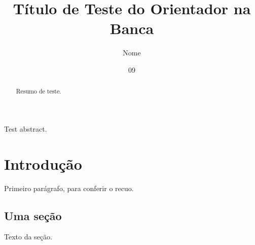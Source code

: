 \documentclass[dsc,orientadorexamina]{ufrj}
\title{Título de Teste do Orientador na Banca}
\author{Nome}{de Teste}
\date{09}{2026}
\begin{document}
  \maketitle
  \frontmatter
  \begin{abstract}
    Resumo de teste.
  \end{abstract}
  \begin{foreignabstract}
    Test abstract.
  \end{foreignabstract}
  \tableofcontents
  \mainmatter
  \chapter{Introdução}
    Primeiro parágrafo, para conferir o recuo.
  \section{Uma seção}
    Texto da seção.
\end{document}

